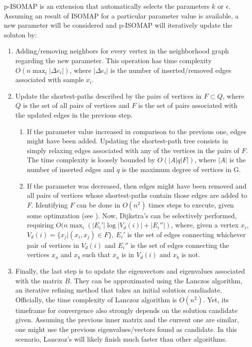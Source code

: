 \documentclass[12pt]{report}
\begin{document}
p-ISOMAP is an extension that automatically selects the parameters $k$ or $\epsilon$. \cite{choo2010p} Assuming an result of ISOMAP for a particular parameter value is available, a new parameter will be considered and p-ISOMAP will iteratively update the soluton by:
\begin{enumerate}
	\item Adding/removing neighbors for every vertex in the neighborhood graph regarding the new parameter. This operation has time complexity $O(n \max_i |\Delta e_i|)$, where $|\Delta e_i|$ is the number of inserted/removed edges associated with sample $x_i$.
	
	\item Update the shortest-paths described by the pairs of vertices in $F \subset Q$, where $Q$ is the set of all pairs of vertices and $F$ is the set of pairs associated with the updated edges in the previous step.
	\begin{enumerate}
		\item	If the parameter value increased in comparison to the previous one, edges might have been added. Updating the shortest-path tree consists in simply relaxing edges associated with any of the vertices in the pairs of $F$. The time complexity is loosely bounded by $O(|A|q|F|)$, where $|A|$ is the number of inserted edges and $q$ is the maximum degree of vertices in G.
		
		\item If the parameter was decreased, then edges might have been removed and all pairs of vertices whose shortest-paths contain those edges are added to $F$. Identifying $F$ can be done in $O(n^2)$ times steps to execute, given some optimzation (see \cite{choo2010p}). Now, Dijkstra's can be selectively performed, requiring $O(n \max_i (|E_i'| \log |V_d(i)| + |E_i''|)$, where, given a vertex $x_i$, $V_d(i)=\{x_j | (x_i, x_j) \in F\}$, $E_i'$ is the set of edges connecting whichever pair of vertices in $V_d(i)$ and $E_i''$ is the set of edges connecting the vertices $x_a$ and $x_b$ such that $x_a$ is in $V_d(i)$ and $x_b$ is not.
	\end{enumerate}

	\item Finally, the last step is to update the eigenvectors and eigenvalues associated with the matrix $B$. They can be approximated using the Lanczos algorithm, an iterative refining method that takes an initial solution candiadate. Officially, the time complexity of Lanczoz algorithm is $O(n^2)$. \cite{chen2004machine} Yet, its timeframe for convergence also strongly depends on the solution candidate given. Assuming the previous inner matrix and the current one are similar, one might use the previous eigenvalues/vectors found as candidate. In this scenario, Lanczoz's will likely finish much faster than other algorithms.
\end{enumerate}
\end{document}
